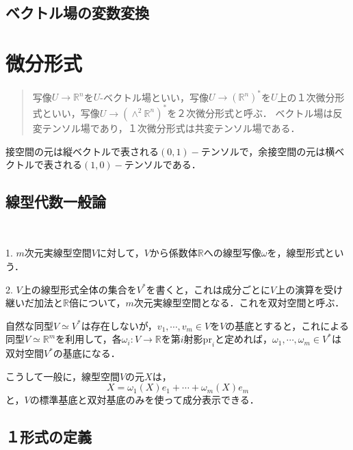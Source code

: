 \documentclass[uplatex, dvipdfmx]{jsreport}
\begin{document}
\section{ベクトル場の変数変換}

\chapter{微分形式}

\begin{quote}
    写像$U\to\mathbb{R}^n$を$U$-ベクトル場といい，写像$U\to (\mathbb{R}^n)^*$を$U$上の１次微分形式といい，写像$U\to (\wedge^2\mathbb{R}^n)^*$を２次微分形式と呼ぶ．
ベクトル場は反変テンソル場であり，１次微分形式は共変テンソル場である．
\end{quote}

接空間の元は縦ベクトルで表される$(0,1)-$テンソルで，余接空間の元は横ベクトルで表される$(1,0)-$テンソルである．

\section{線型代数一般論}

\begin{definition}　
    
    1. $m$次元実線型空間$V$に対して，$V$から係数体$\mathbb{R}$への線型写像$\omega$を，線型形式という．

    2. $V$上の線型形式全体の集合を$V^*$を書くと，これは成分ごとに$V$上の演算を受け継いだ加法と$\mathbb{R}$倍について，$m$次元実線型空間となる．これを双対空間と呼ぶ．
\end{definition}

\begin{proposition}
    自然な同型$V\simeq V^*$は存在しないが，$v_1,\cdots, v_m\in V$を$V$の基底とすると，これによる同型$V\simeq\mathbb{R}^m$を利用して，各$\omega_i:V\to\mathbb{R}$を第$i$射影$\mathrm{pr}_i$と定めれば，$\omega_1,\cdots,\omega_m\in V^*$は双対空間$V^*$の基底になる．
\end{proposition}
\begin{remark}
    こうして一般に，線型空間$V$の元$X$は，
    \[ X=\omega_1(X)e_1+\cdots +\omega_m(X)e_m \]
    と，$V$の標準基底と双対基底のみを使って成分表示できる．
\end{remark}

\section{１形式の定義}
\end{document}
